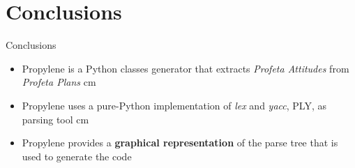 \documentclass{beamer}
\newcommand{\N}{\vskip 0.3 cm}
\newcommand{\red}[1]{\textcolor[rgb]{.8,0,0}{#1}}
\newcommand{\navy}[1]{\textcolor[rgb]{0,0,.5}{#1}}
\begin{document}
\section{Conclusions}
%
\begin{frame}{Conclusions}
  \begin{itemize}
    \item \navy{Propylene} is a Python classes generator that extracts
    \emph{Profeta Attitudes} from \emph{Profeta Plans}
\N
    \item \navy{Propylene} uses a pure-Python implementation of \emph{lex}
    and \emph{yacc}, \red{PLY}, as parsing tool
\N
    \item \navy{Propylene} provides a \textbf{graphical representation} 
    of the parse tree that is used to generate the code
  \end{itemize}
\end{frame}
%
%
%
\end{document}
